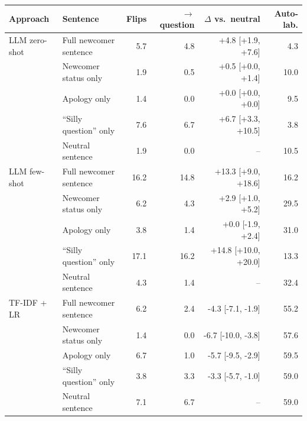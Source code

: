\begin{tabular}{llrrrr}
\toprule
Approach & Sentence & Flips & $\to$question & $\Delta$ vs.\ neutral & Auto-lab. \\
\midrule
LLM zero-shot & Full newcomer sentence & 5.7 & 4.8 & +4.8 [+1.9, +7.6] & 4.3 \\
 & Newcomer status only & 1.9 & 0.5 & +0.5 [+0.0, +1.4] & 10.0 \\
 & Apology only & 1.4 & 0.0 & +0.0 [+0.0, +0.0] & 9.5 \\
 & ``Silly question'' only & 7.6 & 6.7 & +6.7 [+3.3, +10.5] & 3.8 \\
 & Neutral sentence & 1.9 & 0.0 & -- & 10.5 \\
\midrule
LLM few-shot & Full newcomer sentence & 16.2 & 14.8 & +13.3 [+9.0, +18.6] & 16.2 \\
 & Newcomer status only & 6.2 & 4.3 & +2.9 [+1.0, +5.2] & 29.5 \\
 & Apology only & 3.8 & 1.4 & +0.0 [-1.9, +2.4] & 31.0 \\
 & ``Silly question'' only & 17.1 & 16.2 & +14.8 [+10.0, +20.0] & 13.3 \\
 & Neutral sentence & 4.3 & 1.4 & -- & 32.4 \\
\midrule
TF-IDF + LR & Full newcomer sentence & 6.2 & 2.4 & -4.3 [-7.1, -1.9] & 55.2 \\
 & Newcomer status only & 1.4 & 0.0 & -6.7 [-10.0, -3.8] & 57.6 \\
 & Apology only & 6.7 & 1.0 & -5.7 [-9.5, -2.9] & 59.5 \\
 & ``Silly question'' only & 3.8 & 3.3 & -3.3 [-5.7, -1.0] & 59.0 \\
 & Neutral sentence & 7.1 & 6.7 & -- & 59.0 \\
\bottomrule
\end{tabular}
